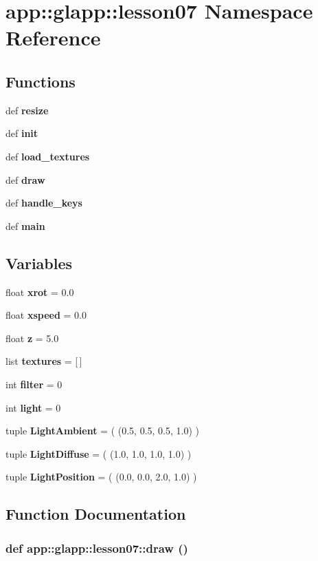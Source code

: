 \section{app::glapp::lesson07 Namespace Reference}
\label{namespaceapp_1_1glapp_1_1lesson07}


\subsection*{Functions}
\begin{CompactItemize}
\item 
def {\bf resize}
\item 
def {\bf init}
\item 
def {\bf load\_\-textures}
\item 
def {\bf draw}
\item 
def {\bf handle\_\-keys}
\item 
def {\bf main}
\end{CompactItemize}
\subsection*{Variables}
\begin{CompactItemize}
\item 
float {\bf xrot} = 0.0
\item 
float {\bf xspeed} = 0.0
\item 
float {\bf z} = 5.0
\item 
list {\bf textures} = [$\,$]
\item 
int {\bf filter} = 0
\item 
int {\bf light} = 0
\item 
tuple {\bf LightAmbient} = ( (0.5, 0.5, 0.5, 1.0) )
\item 
tuple {\bf LightDiffuse} = ( (1.0, 1.0, 1.0, 1.0) )
\item 
tuple {\bf LightPosition} = ( (0.0, 0.0, 2.0, 1.0) )
\end{CompactItemize}


\subsection{Function Documentation}
\subsubsection{\setlength{\rightskip}{0pt plus 5cm}def app::glapp::lesson07::draw ()}\label{namespaceapp_1_1glapp_1_1lesson07_6ac00994e9e486af1b629e042b3ea0ab}




